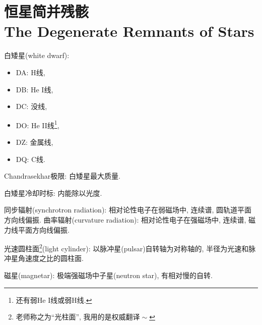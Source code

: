 \chapter{恒星简并残骸\\The Degenerate Remnants of Stars}

白矮星(white dwarf):
\begin{itemize}
    \item DA: H线,
    \item DB: He I线,
    \item DC: 没线,
    \item DO: He II线\footnote{还有弱He I线或弱H线.},
    \item DZ: 金属线,
    \item DQ: C线.
\end{itemize}

Chandrasekhar极限: 白矮星最大质量.

白矮星冷却时标: 内能除以光度.

同步辐射(synchrotron radiation): 相对论性电子在弱磁场中, 连续谱, 圆轨道平面方向线偏振. 曲率辐射(curvature radiation): 相对论性电子在强磁场中, 连续谱, 磁力线平面方向线偏振.

光速圆柱面\footnote{老师称之为``光柱面'', 我用的是权威翻译$\!\sim$}(light cylinder): 以脉冲星(pulsar)自转轴为对称轴的, 半径为光速和脉冲星角速度之比的圆柱面.

磁星(magnetar): 极端强磁场中子星(neutron star), 有相对慢的自转.
